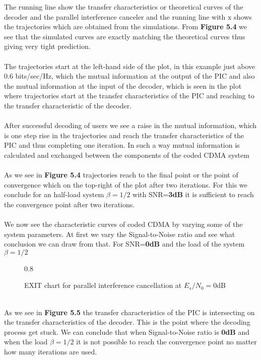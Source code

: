 The running line show the transfer characteristics or theoretical curves of the decoder and the parallel interference canceler and the running line with $\mathrm{x}$ shows the trajectories which are obtained from the simulations. From \textbf{Figure 5.4} we see that the simulated curves are exactly matching the theoretical curves thus giving very tight prediction. \\ \\
The trajectories start at the left-hand side of the plot, in this example just above 0.6 bits/sec/Hz, which the mutual information at the output of the PIC and also the mutual information at the input of the decoder, which is seen in the plot where trajectories start at the transfer characteristics of the PIC and reaching to the transfer characteristic of the decoder. \\ \\
After successful decoding of users we see a raise in the mutual information, which is one step rise in the trajectories and reach the transfer characteristics of the PIC and thus completing one iteration. In such a way mutual information is calculated and exchanged between the components of the coded CDMA system \\ \\
As we see in \textbf{Figure 5.4} trajectories reach to the final point or the point of convergence which on the top-right of the plot after two iterations. For this we conclude for an half-load system $\beta=1/2$ with SNR=\textbf{3dB} it is sufficient to reach the convergence point after two iterations.\\ \\
We now see the characteristic curves of coded CDMA by varying some of the system parameters. At first we vary the Signal-to-Noise ratio and see what conclusion we can draw from that.
\newpage
For SNR=\textbf{0dB} and the load of the system $\beta=1/2$
\begin{figure*}[htb]
\centerline{  {0.8}}
\caption{EXIT chart for parallel interference cancellation at $E_s/N_0=0$dB}
\end{figure*}\\
As we see in \textbf{Figure 5.5} the transfer characteristics of the PIC is intersecting on the transfer characteristics of the decoder. This is the point where the decoding process get stuck. We can conclude that when Signal-to-Noise ratio is \textbf{0dB} and when the load $\beta=1/2$ it is not possible to reach the convergence point no matter how many iterations are used.\\ \\
